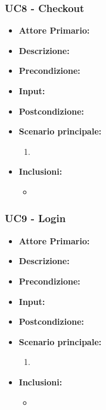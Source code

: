 \subsubsection{UC8 - Checkout}
\begin{itemize}
    \item \textbf{Attore Primario:} 
    \item \textbf{Descrizione:}
    \item \textbf{Precondizione:}
    \item \textbf{Input:}
    \item \textbf{Postcondizione:}
    \item \textbf{Scenario principale:}
    \begin{enumerate}
        \item 
    \end{enumerate}
    \item \textbf{Inclusioni:}
    \begin{itemize}
        \item
    \end{itemize}
\end{itemize}
\subsubsection{UC9 - Login}
\begin{itemize}
    \item \textbf{Attore Primario:} 
    \item \textbf{Descrizione:}
    \item \textbf{Precondizione:}
    \item \textbf{Input:}
    \item \textbf{Postcondizione:}
    \item \textbf{Scenario principale:}
    \begin{enumerate}
        \item 
    \end{enumerate}
    \item \textbf{Inclusioni:}
    \begin{itemize}
        \item
    \end{itemize}
\end{itemize}
